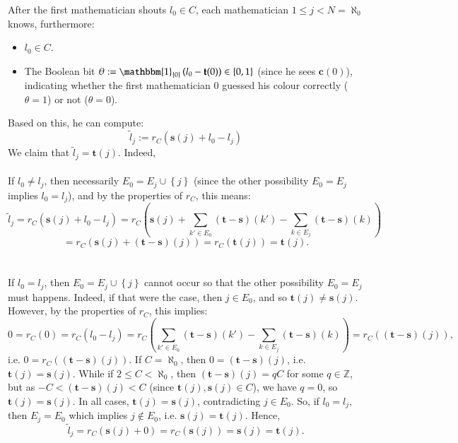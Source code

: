 \documentclass[11pt, a4paper, oneside]{article}
\theoremstyle{remark}
\theoremstyle{lemma}
\begin{document}
After the first mathematician shouts \(l_0 \in C\), each mathematician \(1 \leq j < N = \aleph_0\) knows, furthermore:
\begin{itemize}
    \item \(l_0 \in C\).
    \item The Boolean bit \(\theta := \mathbbm{1}_{\left\{0\right\}}\left(l_0 - \mathbf{t}(0)\right) \in \left\{0, 1\right\}\) (since he sees \(\mathbf{c}(0)\)), indicating whether the first mathematician \(0\) guessed his colour correctly (\(\theta = 1\)) or not (\(\theta = 0\)).
\end{itemize}
Based on this, he can compute:
\[
\tilde{l}_j := r_{C}\left(\mathbf{s}(j) + l_0 - l_j\right)
\]
We claim that \(\tilde{l}_j = \mathbf{t}(j)\). Indeed,
\\\\
If \(l_0 \neq l_j\), then necessarily \(E_0 = E_j \cup \left\{j\right\}\) (since the other possibility \(E_0 = E_j\) implies \(l_0 = l_j\)), and by the properties of \(r_C\), this means:
\[
\tilde{l}_j = r_{C}\left(\mathbf{s}(j) + l_0 - l_j\right) = r_{C}\left(\mathbf{s}(j) + \sum_{k' \in E_0} \left(\mathbf{t} - \mathbf{s}\right)(k') - \sum_{k \in E_j} \left(\mathbf{t} - \mathbf{s}\right)(k)\right)
\]
\[
= r_{C}\left(\mathbf{s}(j) + \left(\mathbf{t} - \mathbf{s}\right)(j)\right) = r_{C}\left(\mathbf{t}(j)\right) = \mathbf{t}(j).
\]
\\\\
If \(l_0 = l_j\), then \(E_0 = E_j \cup \left\{j\right\}\) cannot occur so that the other possibility $E_0=E_j$ must happens. Indeed, if that were the case, then \(j \in E_0\), and so \(\mathbf{t}(j) \neq \mathbf{s}(j)\). However, by the properties of \(r_C\), this implies:
\[
0 = r_{C}(0) = r_{C}\left(l_0 - l_j\right) = r_{C}\left(\sum_{k' \in E_0} \left(\mathbf{t} - \mathbf{s}\right)(k') - \sum_{k \in E_j} \left(\mathbf{t} - \mathbf{s}\right)(k)\right) = r_{C}\left(\left(\mathbf{t} - \mathbf{s}\right)(j)\right),
\]
i.e. \(0 = r_{C}\left(\left(\mathbf{t} - \mathbf{s}\right)(j)\right)\). If \(C = \aleph_0\), then \(0 = \left(\mathbf{t} - \mathbf{s}\right)(j)\), i.e. \(\mathbf{t}(j) = \mathbf{s}(j)\). While if \(2 \leq C < \aleph_0\), then \(\left(\mathbf{t} - \mathbf{s}\right)(j) = qC\) for some \(q \in \mathbb{Z}\), but as \(-C < \left(\mathbf{t} - \mathbf{s}\right)(j) < C\) (since \(\mathbf{t}(j), \mathbf{s}(j) \in C\)), we have \(q = 0\), so \(\mathbf{t}(j) = \mathbf{s}(j)\). In all cases, \(\mathbf{t}(j) = \mathbf{s}(j)\), contradicting \(j \in E_0\). So, if \(l_0 = l_j\), then \(E_j = E_0\) which implies \(j \notin E_0\), i.e. \(\mathbf{s}(j) = \mathbf{t}(j)\). Hence, \[\tilde{l}_j = r_{C}\left(\mathbf{s}(j) + 0\right) = r_{C}\left(\mathbf{s}(j)\right)=\mathbf{s}(j)=\mathbf{t}(j).\]
\end{document}
